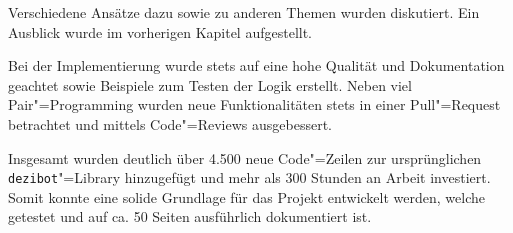 Verschiedene Ansätze dazu sowie zu anderen Themen wurden diskutiert. Ein Ausblick wurde im vorherigen Kapitel aufgestellt.

Bei der Implementierung wurde stets auf eine hohe Qualität und Dokumentation geachtet sowie Beispiele zum Testen der Logik erstellt. Neben viel Pair"=Programming wurden neue Funktionalitäten stets in einer Pull"=Request betrachtet und mittels Code"=Reviews ausgebessert.

Insgesamt wurden deutlich über 4.500 neue Code"=Zeilen zur ursprünglichen \texttt{dezibot}"=Library hinzugefügt und mehr als 300 Stunden an Arbeit investiert. Somit konnte eine solide Grundlage für das Projekt entwickelt werden, welche getestet und auf ca. 50 Seiten ausführlich dokumentiert ist.
